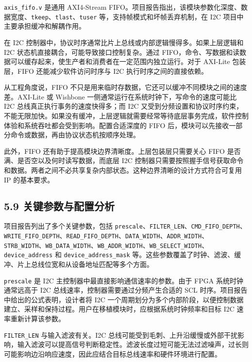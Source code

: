 \texttt{axis\_fifo.v} 是通用 AXI4-Stream FIFO。项目报告指出，该模块参数化深度、数据宽度、\texttt{tkeep}、\texttt{tlast}、\texttt{tuser} 等，支持帧模式和坏帧丢弃机制，在 I2C 项目中主要承担缓冲和解耦作用。

在 I2C 控制器中，协议时序通常比片上总线或内部逻辑慢得多。如果上层逻辑和 I2C 状态机直接耦合，可能导致接口控制复杂。通过 FIFO，命令、写数据和读数据可以缓存起来，使生产者和消费者在一定范围内独立运行。对于 AXI-Lite 包装层，FIFO 还能减少软件访问时序与 I2C 执行时序之间的直接依赖。

从工程角度说，FIFO 不只是用来临时存数据，它还可以缓冲不同模块之间的速度差。AXI-Lite 或 Wishbone 一侧通常运行在系统时钟下，写命令的速度可能比 I2C 总线真正执行事务的速度快得多；而 I2C 又受到分频设置和协议时序约束，不能无限加快。如果没有缓冲，上层逻辑就需要经常等待底层事务完成，软件控制体验和系统吞吐都会受到影响。配置合适深度的 FIFO 后，模块可以先接收一部分命令或数据，再由协议状态机按顺序处理。

此外，FIFO 还有助于提高模块边界清晰度。上层包装层只需要关心 FIFO 是否满、是否空以及何时读写数据，而底层 I2C 控制器只需要按照握手信号获取命令和数据。两者之间不必共享复杂内部状态。这种边界清晰的设计方式符合可复用 IP 的基本要求。

\subsection{5.9 关键参数与配置分析}\label{ux5173ux952eux53c2ux6570ux4e0eux914dux7f6eux5206ux6790}

项目报告列出了多个关键参数，包括 \texttt{prescale}、\texttt{FILTER\_LEN}、\texttt{CMD\_FIFO\_DEPTH}、\texttt{WRITE\_FIFO\_DEPTH}、\texttt{READ\_FIFO\_DEPTH}、\texttt{DATA\_WIDTH}、\texttt{ADDR\_WIDTH}、\texttt{STRB\_WIDTH}、\texttt{WB\_DATA\_WIDTH}、\texttt{WB\_ADDR\_WIDTH}、\texttt{WB\_SELECT\_WIDTH}、\texttt{device\_address} 和 \texttt{device\_address\_mask} 等。这些参数覆盖了时钟、滤波、缓冲、片上总线位宽和从设备地址匹配等多个方面。

\texttt{prescale} 是 I2C 主控制器中最直接影响通信速率的参数。由于 FPGA 系统时钟通常远高于 I2C 总线速率，控制器需要通过分频产生合适的 SCL 时序。项目报告中给出的公式表明，设计者将 I2C 一个周期划分为多个内部阶段，以便控制数据建立、采样和保持过程。用户在移植模块时，应根据系统时钟频率和目标 I2C 速率重新计算该参数。

\texttt{FILTER\_LEN} 与输入滤波有关。I2C 总线可能受到毛刺、上升沿缓慢或外部干扰影响，输入滤波可以提高信号判断稳定性。滤波长度过短可能无法过滤噪声，过长则可能影响边沿响应速度，因此应结合目标总线速率和硬件环境进行配置。

